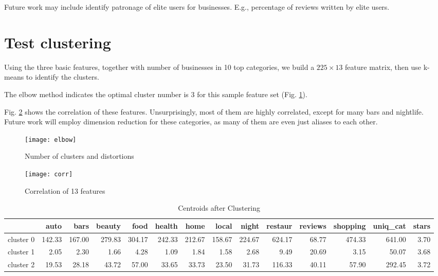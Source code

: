 \documentclass[draftclsnofoot]{IEEEtran}
\let\MYoriglatexcaption\caption
\renewcommand{\caption}[2][\relax]{\MYoriglatexcaption[#2]{#2}}
\begin{document}
Future work may include identify patronage of elite users for businesses. E.g., percentage of reviews written by elite users.

\section{Test clustering}

Using the three basic features, together with number of businesses in 10 top categories, we build a $225\times13$ feature matrix, then use k-means to identify the clusters.

The elbow method indicates the optimal cluster number is 3 for this sample feature set (Fig. \ref{elbow}).

Fig. \ref{corr} shows the correlation of these features. Unsurprisingly, most of them are highly correlated, except for many bars and nightlife. Future work will employ dimension reduction for these categories, as many of them are even just aliases to each other.
 
\begin{figure}[htbp]
\centering
\texttt{[image: elbow]}
\caption{Number of clusters and distortions}
\label{elbow}
\end{figure}

\begin{figure}[htbp]
\centering
\texttt{[image: corr]}
\caption{Correlation of 13 features}
\label{corr}
\end{figure}

\begin{table}[htbp]
\caption{Centroids after Clustering}
\label{cluster-centroids}
\begin{tabular}{lrrrrrrrrrrrrr}
\toprule
{} &  auto &  bars &  beauty &  food &  health &  home &  local &  night &  restaur & reviews &  shopping &  uniq\_cat &  stars \\
\midrule
cluster 0 &        142.33 &  167.00 &        279.83 &  304.17 &           242.33 &          212.67 &           158.67 &       224.67 &         624.17 &         68.77 &      474.33 &               641.00 &       3.70 \\
cluster 1 &          2.05 &    2.30 &          1.66 &    4.28 &             1.09 &            1.84 &             1.58 &         2.68 &           9.49 &         20.69 &        3.15 &                50.07 &       3.68 \\
cluster 2 &         19.53 &   28.18 &         43.72 &   57.00 &            33.65 &           33.73 &            23.50 &        31.73 &         116.33 &         40.11 &       57.90 &               292.45 &       3.72 \\
\bottomrule
\end{tabular}
\end{table}
\end{document}
